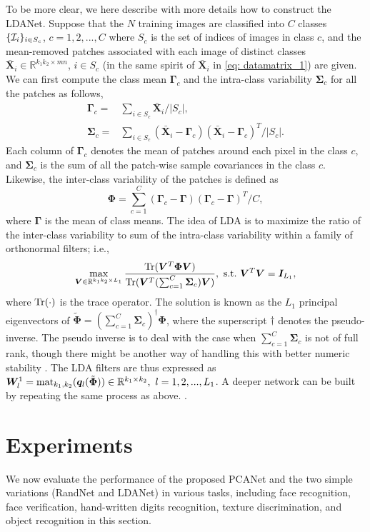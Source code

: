 \documentclass[10pt,journal,compsoc]{IEEEtran}
\begin{document}
To be more clear, we here describe with more details how to construct the LDANet. Suppose that the $N$ training images are classified into $C$ classes $\{{\cal I}_i\}_{i\in S_c}$, $c = 1,2,...,C$ where $S_c$ is the set of indices of images in class $c$, and the mean-removed patches associated with each image of distinct classes $\bar{\bm{X}}_i \in \mathbb{R}^{k_1k_2 \times mn}$, $i \in S_c$ (in the same spirit of $\bar{\bm{X}}_i$ in \eqref{eq: datamatrix_1}) are given. We can first compute the class mean $\bm{\Gamma}_c$ and the intra-class variability $\bm{\Sigma}_c$ for all the patches as follows,
\begin{align}
\bm{\Gamma}_c = & \sum_{i \in S_c} \bar{\bm{X}}_i / |S_c|, \\
\bm{\Sigma}_c = & \sum_{i \in S_c} (\bar{\bm{X}}_i - \bm{\Gamma}_c)(\bar{\bm{X}}_i - \bm{\Gamma}_c)^T / |S_c|.
\end{align}
Each column of $\bm{\Gamma}_c$ denotes the mean of patches around each pixel in the class $c$, and $\bm{\Sigma}_c$ is the sum of all the patch-wise sample covariances in the class $c$. Likewise, the inter-class variability of the patches is defined as
\begin{equation}
\bm{\Phi} = \sum_{c = 1}^C (\bm{\Gamma}_c - \bm{\Gamma})(\bm{\Gamma}_c - \bm{\Gamma})^T / C,
\end{equation}where $\bm{\Gamma}$ is the mean of class means. The idea of LDA is to maximize the ratio of the inter-class variability to sum of the intra-class variability within a family of orthonormal filters; i.e.,
\begin{equation}
\max_{\bm{ V}\in \mathbb{R}^{k_1k_2 \times L_1}} \frac{{\rm Tr}(\bm{V}^T \bm{\Phi} \bm{V})}{{\rm Tr}(\bm{V}^T (\sum_{c = 1}^C\bm{\Sigma}_c) \bm{V})} ,~{\rm s.t.}~ \bm{ V}^T\bm{ V} = \bm{I}_{L_1},
\end{equation}
where ${\rm Tr}(\cdot)$ is the trace operator. The solution is known as the $L_1$ principal eigenvectors of $\tilde{\bm{\Phi}} = (\sum_{c = 1}^C\bm{\Sigma}_c)^{\dag}\bm{\Phi}$, where the superscript ${\dag}$ denotes the pseudo-inverse. The pseudo inverse is to deal with the case when $\sum_{c = 1}^C\bm{\Sigma}_c$ is not of full rank, though there might be another way of handling this with better numeric stability \cite{Yu2001}. The LDA filters are thus expressed as $\bm{W}^1_l = {\rm mat}_{k_1,k_2}(\bm{ q}_l(\tilde{\bm{\Phi}}))\in\mathbb{R}^{k_1 \times k_2},~l = 1,2,...,L_1$. A deeper network can be built by repeating the same process as above. .


\section{Experiments}\label{sec: experiments}
We now evaluate the performance of the proposed PCANet and the two simple variations (RandNet and LDANet) in various tasks, including face recognition, face verification, hand-written digits recognition, texture discrimination, and object recognition in this section.
\end{document}
